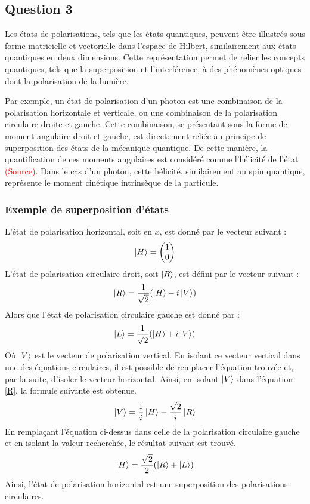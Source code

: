 \documentclass[11pt,letterpaper]{article}
\begin{document}
\subsection{Question 3}
Les états de polarisations, tels que les états quantiques, peuvent être illustrés sous forme matricielle et vectorielle dans l'espace de Hilbert, similairement aux états quantiques en deux dimensions. Cette représentation permet de relier les concepts quantiques, tels que la superposition et l'interférence, à des phénomènes optiques dont la polarisation de la lumière. 

Par exemple, un état de polarisation d'un photon est une combinaison de la polarisation horizontale et verticale, ou une combinaison de la polarisation circulaire droite et gauche. Cette combinaison, se présentant sous la forme de moment angulaire droit et gauche, est directement reliée au principe de superposition des états de la mécanique quantique. De cette manière, la quantification de ces moments angulaires est considéré comme l'hélicité de l'état \textcolor{red}{(Source)}. Dans le cas d'un photon, cette hélicité, similairement au spin quantique, représente le moment cinétique intrinsèque de la particule.

\subsubsection{Exemple de superposition d'états}
L'état de polarisation horizontal, soit en $x$, est donné par le vecteur suivant :
\begin{equation}
  \ket{H}=
  \begin{pmatrix}
    1 \\
    0 \\
  \end{pmatrix}
\end{equation}
L'état de polarisation circulaire droit, soit $\ket{R}$, est défini par le vecteur suivant :
\begin{equation}
  \ket{R}=\frac{1}{\sqrt{2}}(\ket{H}-i\ket{V})
  \label{R}
\end{equation}
Alors que l'état de polarisation circulaire gauche est donné par :
\begin{equation}
  \ket{L}=\frac{1}{\sqrt{2}}(\ket{H}+i\ket{V})
\end{equation}
Où $\ket{V}$ est le vecteur de polarisation vertical. En isolant ce vecteur vertical dans une des équations circulaires, il est possible de remplacer l'équation trouvée et, par la suite, d'isoler le vecteur horizontal. Ainsi, en isolant $\ket{V}$ dans l'équation \ref{R}, la formule suivante est obtenue.
\begin{equation}
  \ket{V}=\frac{1}{i}\ket{H}-\frac{\sqrt{2}}{i}\ket{R}
\end{equation}
En remplaçant l'équation ci-dessus dans celle de la polarisation circulaire gauche et en isolant la valeur recherchée, le résultat suivant est trouvé.
\begin{equation}
  \ket{H}=\frac{\sqrt{2}}{2}(\ket{R}+\ket{L})
\end{equation}
Ainsi, l'état de polarisation horizontal est une superposition des polarisations circulaires.
\end{document}
